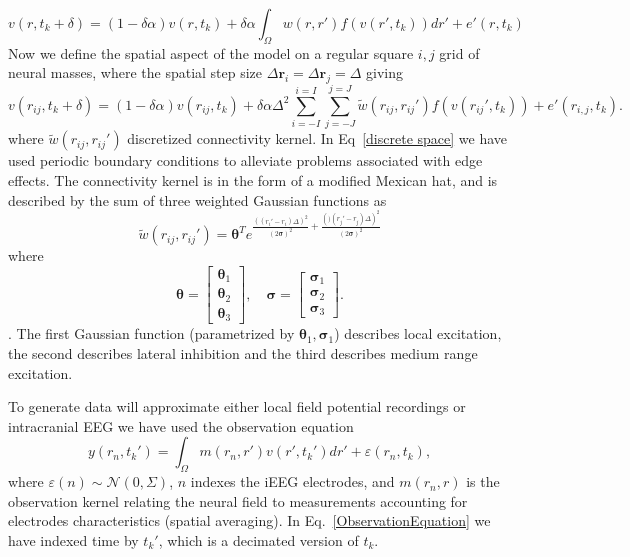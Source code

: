 \documentclass[onecolumn,draftcls]{IEEEtran}
\begin{document}
\begin{equation}\label{discrete time model2}
	v\left(r,t_k + \delta \right) =  (1 - \delta \alpha) v(r,t_k) + \delta \alpha \int_\Omega  {w\left( r,r' \right)f\left( {v\left( r',t_k \right)} \right)dr'} + e'(r,t_k)
\end{equation}
Now we define the spatial aspect of the model on a regular square $i,j$ grid of neural masses, where the spatial step size $\Delta \mathbf{r}_i = \Delta \mathbf{r}_j = \Delta $ giving
\begin{equation}\label{discrete space}
	v\left(r_{ij},t_k + \delta \right) =  (1 - \delta \alpha)v(r_{ij},t_k) + \delta \alpha \Delta^2 \sum_{i=-I}^{i=I}{\sum_{j=-J}^{j=J}{\tilde{w}\left( r_{ij},r_{ij}' \right)f\left( v\left( r_{ij}',t_k \right) \right)} }+ e'(r_{i,j},t_k).
\end{equation}
where $\tilde{w}(r_{ij},r_{ij}')$ discretized connectivity kernel. In Eq~\ref{discrete space} we have used periodic boundary conditions to alleviate problems associated with edge effects. The connectivity kernel is in the form of a modified Mexican hat, and is described by the sum of three weighted Gaussian functions as
\begin{equation}
	\tilde{w}(r_{ij},r_{ij}') = \mathbf{\theta}^T e^{\frac{\left(\left(r_i'-r_i\right)\Delta\right)^2}{(2\mathbf{\sigma})^2} + \frac{\left()\left(r_j'-r_j\right)\Delta\right)^2}{(2\mathbf{\sigma})^2}}
\end{equation}
where
\begin{equation}
 \mathbf{\theta}=\begin{bmatrix} \mathbf{\theta}_{1}\\\mathbf{\theta}_{2}\\\mathbf \theta_{3}\end{bmatrix},\quad \mathbf{\sigma}=\begin{bmatrix}\mathbf{\sigma}_1\\\mathbf{\sigma}_2\\ \mathbf{\sigma}_3\end{bmatrix}.
\end{equation}.
The first Gaussian function (parametrized by $\mathbf{\theta}_1, \mathbf{\sigma}_1$) describes local excitation, the second describes lateral inhibition and the third describes medium range excitation. 
 
To generate data will approximate either local field potential recordings or intracranial EEG we have used the observation equation
\begin{equation}\label{ObservationEquation}
    y(r_n,t_k') = \int_\Omega  m( r_n,r' ) v( r',t_k' ) dr'  + \varepsilon ( r_n,t_k ),
\end{equation}
where $\varepsilon( n )\sim\mathcal{N}(0,\Sigma)$, $n$ indexes the iEEG electrodes, and $m(r_n,r)$ is the observation kernel relating the neural field to measurements accounting for electrodes characteristics (spatial averaging). In Eq.~\ref{ObservationEquation} we have indexed time by $t_k'$, which is a decimated version of $t_k$. 
\end{document}

